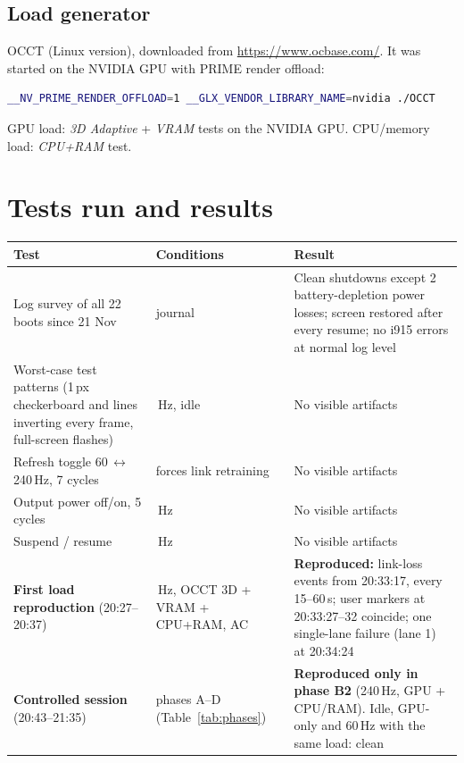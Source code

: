 \documentclass[11pt,a4paper]{article}
\begin{document}
\subsection{Load generator}
OCCT (Linux version), downloaded from \url{https://www.ocbase.com/}. It was started on the NVIDIA GPU with PRIME render offload:
\begin{lstlisting}[language=bash]
__NV_PRIME_RENDER_OFFLOAD=1 __GLX_VENDOR_LIBRARY_NAME=nvidia ./OCCT
\end{lstlisting}
GPU load: \emph{3D Adaptive} + \emph{VRAM} tests on the NVIDIA GPU. CPU/memory load: \emph{CPU+RAM} test.

\section{Tests run and results}
\begin{longtable}{@{}>{\raggedright\arraybackslash}p{4.6cm} >{\raggedright\arraybackslash}p{3.4cm} >{\raggedright\arraybackslash}p{7.4cm}@{}}
\toprule
Test & Conditions & Result\\
\midrule
\endhead
Log survey of all 22 boots since 21 Nov & journal & Clean shutdowns except 2 battery-depletion power losses; screen restored after every resume; no i915 errors at normal log level\\
Worst-case test patterns (1\,px checkerboard and lines inverting every frame, full-screen flashes) & 240\,Hz, idle & No visible artifacts\\
Refresh toggle 60\,$\leftrightarrow$\,240\,Hz, 7 cycles & forces link retraining & No visible artifacts\\
Output power off/on, 5 cycles & 240\,Hz & No visible artifacts\\
Suspend / resume & 240\,Hz & No visible artifacts\\
\textbf{First load reproduction} (20:27--20:37) & 240\,Hz, OCCT 3D + VRAM + CPU+RAM, AC & \textbf{Reproduced:} link-loss events from 20:33:17, every 15--60\,s; user markers at 20:33:27--32 coincide; one single-lane failure (lane 1) at 20:34:24\\
\textbf{Controlled session} (20:43--21:35) & phases A--D (Table~\ref{tab:phases}) & \textbf{Reproduced only in phase B2} (240\,Hz, GPU + CPU/RAM). Idle, GPU-only and 60\,Hz with the same load: clean\\
\bottomrule
\end{longtable}
\end{document}
